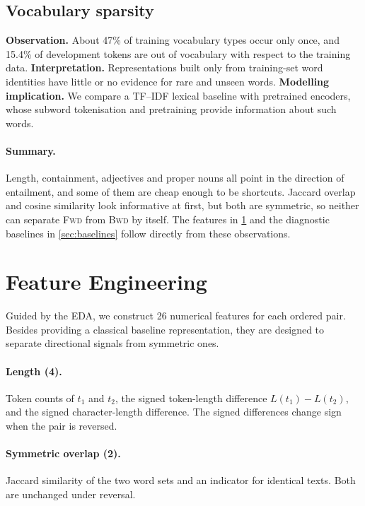 \documentclass[11pt,a4paper]{article}
\newcommand{\FWD}{\textsc{Fwd}}
\newcommand{\BWD}{\textsc{Bwd}}
\begin{document}
\subsection{Vocabulary sparsity}
\textbf{Observation.} About 47\% of training vocabulary types occur only once, and 15.4\% of development tokens are out of vocabulary with respect to the training data.
\textbf{Interpretation.} Representations built only from training-set word identities have little or no evidence for rare and unseen words.
\textbf{Modelling implication.} We compare a TF--IDF lexical baseline with pretrained encoders, whose subword tokenisation and pretraining provide information about such words.

\paragraph{Summary.} Length, containment, adjectives and proper nouns all point in the direction of entailment, and some of them are cheap enough to be shortcuts. Jaccard overlap and cosine similarity look informative at first, but both are symmetric, so neither can separate \FWD{} from \BWD{} by itself. The features in \cref{sec:features} and the diagnostic baselines in \cref{sec:baselines} follow directly from these observations.

\section{Feature Engineering}
\label{sec:features}

Guided by the EDA, we construct 26 numerical features for each ordered pair. Besides providing a classical baseline representation, they are designed to separate directional signals from symmetric ones.

\paragraph{Length (4).} Token counts of $t_1$ and $t_2$, the signed token-length difference $L(t_1)-L(t_2)$, and the signed character-length difference. The signed differences change sign when the pair is reversed.

\paragraph{Symmetric overlap (2).} Jaccard similarity of the two word sets and an indicator for identical texts. Both are unchanged under reversal.
\end{document}
